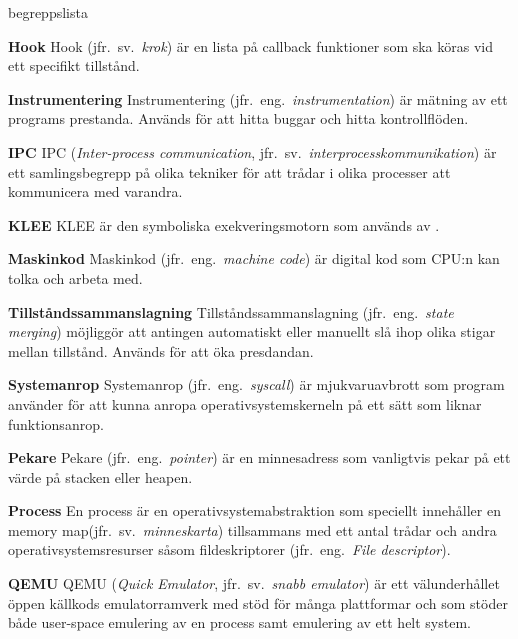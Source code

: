 \begin{labeling}{begreppslista}
    \item [\textbf{Hook}] Hook (jfr.\ sv.\ \emph{krok}) är en lista på callback
    funktioner som ska köras vid ett specifikt tillstånd.

    \item [\textbf{Instrumentering}] Instrumentering (jfr.\ eng.\
    \emph{instrumentation}) är mätning av ett programs prestanda. Används för
    att hitta buggar och hitta kontrollflöden.

    \item [\textbf{IPC}] IPC (\emph{Inter-process communication}, jfr.\ sv.\
    \emph{interprocesskommunikation}) är ett samlingsbegrepp på olika tekniker
    för att trådar i olika processer att kommunicera med varandra.

    \item [\textbf{KLEE}] KLEE är den symboliska exekveringsmotorn som används
    av \stoe{}.

    \item [\textbf{Maskinkod}] Maskinkod (jfr.\ eng.\ \emph{machine code}) är
    digital kod som CPU:n kan tolka och arbeta med.

    \item [\textbf{Tillståndssammanslagning}] Tillståndssammanslagning (jfr.\
    eng.\ \emph{state merging}) möjliggör att antingen automatiskt eller
    manuellt slå ihop olika stigar mellan tillstånd. Används för att öka
    presdandan.

    \item [\textbf{Systemanrop}] Systemanrop (jfr.\ eng.\ \emph{syscall}) är
    mjukvaruavbrott som program använder för att kunna anropa
    operativsystemskerneln på ett sätt som liknar funktionsanrop.

    \item [\textbf{Pekare}] Pekare (jfr.\ eng.\ \emph{pointer}) är en minnesadress som
    vanligtvis pekar på ett värde på stacken eller heapen.

    \item [\textbf{Process}] En process är en
    operativsystemabstraktion som speciellt innehåller en memory
    map(jfr.\ sv.\ \emph{minneskarta}) tillsammans med ett antal trådar och
    andra operativsystemsresurser såsom fildeskriptorer (jfr.\
    eng.\ \emph{File descriptor}).

    \item [\textbf{QEMU}] QEMU (\emph{Quick Emulator}, jfr.\ sv.\ \emph{snabb
        emulator}) är ett välunderhållet öppen källkods emulatorramverk
    med stöd för många plattformar och som stöder både user-space
    emulering av en process samt emulering av ett helt system.


\end{labeling}
